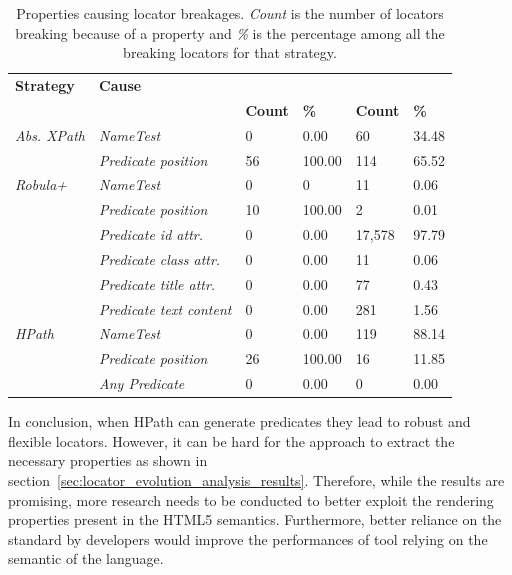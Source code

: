 \begin{table}
\centering
\caption{Properties causing locator breakages. \emph{Count} is the number of locators breaking because of a property and \emph{\%} is the percentage among all the breaking locators for that strategy.}
\label{tab:breakage_cause}
\begin{tabular}{>{\raggedright}m{0.8in}>{\raggedright}m{1.2in}>{\raggedleft}m{0.25in} >{\raggedleft}m{0.4in}>{\raggedleft}m{0.4in} >{\raggedleft}m{0.4in}}
\toprule
\textbf{\scriptsize{Strategy}} & \textbf{\scriptsize{Cause}} & \multicolumn{2}{c}{\textbf{\scriptsize{MISO LIMS}}} & \multicolumn{2}{c}{\textbf{\scriptsize{OpenOLAT}}}\tabularnewline
 &   & \textbf{\scriptsize{Count}} & \textbf{\scriptsize{\%}} & \textbf{\scriptsize{Count}} & \textbf{\scriptsize{\%}}\tabularnewline
\toprule
\scriptsize{\textit{Abs. XPath}} & \scriptsize{\textit{NameTest}} & \scriptsize{0} & \scriptsize{0.00} & \scriptsize{60} & \scriptsize{34.48}\tabularnewline
 & \scriptsize{\textit{Predicate position}} & \scriptsize{56} & \scriptsize{100.00} & \scriptsize{114} & \scriptsize{65.52}\tabularnewline
 \hline
\scriptsize{\textit{Robula+}} & \scriptsize{\textit{NameTest}} & \scriptsize{0} & \scriptsize{0} & \scriptsize{11} & \scriptsize{0.06}\tabularnewline
 & \scriptsize{\textit{Predicate position}} & \scriptsize{10} & \scriptsize{100.00} & \scriptsize{2} & \scriptsize{0.01}\tabularnewline
 & \scriptsize{\textit{Predicate id attr.}} & \scriptsize{0} & \scriptsize{0.00} & \scriptsize{17,578} & \scriptsize{97.79}\tabularnewline
 & \scriptsize{\textit{Predicate class attr.}} & \scriptsize{0} & \scriptsize{0.00} & \scriptsize{11} & \scriptsize{0.06}\tabularnewline
 & \scriptsize{\textit{Predicate title attr.}} & \scriptsize{0} & \scriptsize{0.00} & \scriptsize{77} & \scriptsize{0.43}\tabularnewline
 & \scriptsize{\textit{Predicate text content}} & \scriptsize{0} & \scriptsize{0.00} & \scriptsize{281} & \scriptsize{1.56}\tabularnewline
 \hline
\scriptsize{\textit{HPath}} & \scriptsize{\textit{NameTest}} & \scriptsize{0} & \scriptsize{0.00} & \scriptsize{119} & \scriptsize{88.14}\tabularnewline
 & \scriptsize{\textit{Predicate position}} & \scriptsize{26} & \scriptsize{100.00} & \scriptsize{16} & \scriptsize{11.85}\tabularnewline
 & \scriptsize{\textit{Any Predicate}} & \scriptsize{0} & \scriptsize{0.00} & \scriptsize{0} & \scriptsize{0.00}\tabularnewline
\bottomrule
\end{tabular}
\end{table}

In conclusion, when HPath can generate predicates they lead to robust and flexible locators. However, it can be hard for the approach to extract the necessary properties as shown in section~\ref{sec:locator_evolution_analysis_results}. Therefore, while the results are promising, more research needs to be conducted to better exploit the rendering properties present in the HTML5 semantics. Furthermore, better reliance on the standard by developers would improve the performances of tool relying on the semantic of the language.